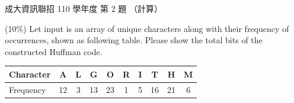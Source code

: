 \begin{pastexam}[label={px:ncku-110-prog-02}]{成大資訊聯招 110 學年度 第 2 題}
（計算）

(10\%) Let input is an array of unique characters along with their frequency of occurrences,
shown as following table. Please show the total bits of the constructed Huffman code.
\begin{center}
\begin{tabular}{|l|c|c|c|c|c|c|c|c|c|}
\hline
Character & A & L & G & O & R & I & T & H & M\\ \hline
Frequency & 12 & 3 & 13 & 23 & 1 & 5 & 16 & 21 & 6\\ \hline
\end{tabular}
\end{center}
\end{pastexam}

